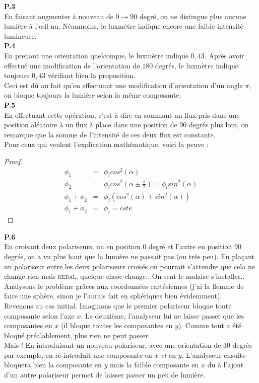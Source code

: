 \documentclass[british,french,11pt, a4paper, openany]{book}
\begin{document}
		\textbf{P.3}\\
		En faisant augmenter à nouveau de $0 \rightarrow 90$ degré, on ne distingue plus aucune lumière à l'œil nu. Néanmoins, le luxmètre indique encore une faible intensité lumineuse.\\
		
		\textbf{P.4}\\
		En prenant une orientation quelconque, le luxmètre indique $0,43$. Après avoir effectué une modification de l'orientation de $180$ degrés, le luxmètre indique toujours $0,43$ vérifiant bien la proposition.\\
		Ceci est dû au fait qu'en effectuant une modification d'orientation d'un angle $\pi$, on bloque toujours la lumière selon la même composante.\\
		
		\textbf{P.5}\\
		En effectuant cette opération, c'est-à-dire en sommant un flux pris dans une position aléatoire à un flux à place dans une position de $90$ degrés plus loin, on remarque que la somme de l'intensité de ces deux flux est constante.\\
		Pour ceux qui veulent l'explication mathématique, voici la peuve : \\
		\begin{proof}
			\begin{eqnarray}
				\phi_1 &=& \phi_icos^2(\alpha)\\
				\phi_2 &=& \phi_icos^2(\alpha \pm \frac{\pi}{2}) = \phi_isin^2(\alpha)\\
				\phi_1 + \phi_2 &=& \phi_i(cos^2(\alpha) + sin^2(\alpha))\\
				\phi_1 + \phi_2 &=& \phi_i = cste
			\end{eqnarray}
		\end{proof}
		
		\textbf{P.6}\\
		En croisant deux polariseurs, un en position $0$ degré et l'autre en position $90$ degrés, on a vu plus haut que la lumière ne passait pas (ou très peu). En plaçant un polariseur entre les deux polariseurs croisés on pourrait s'attendre que cela ne change rien mais \textsc{kedal}, quelque chose change.. On sent le malaise s'installer..\\
		
		Analysons le problème grâces aux coordonnées cartésiennes (j'ai la flemme de faire une sphère, sinon je l'aurais fait en sphériques bien évidemment).\\
		Revenons au cas initial.  Imaginons que le premier polariseur bloque toute composante selon l'axe $x$. Le deuxième, l'analyseur lui ne laisse passer que les composantes en $x$ (il bloque toutes les composantes en $y$). Comme tout a été bloqué préalablement, plus rien ne peut passer.\\
		Mais ! En introduisant un nouveau polariseur, avec une orientation de $30$ degrés par exemple, en ré-introduit une composante en $x$ \textit{et} en $y$. L'analyseur ensuite bloquera bien la composante en $y$ mais la faible composante en $x$ du à l'ajout d'un autre polariseur permet de laisser passer un peu de lumière.\\
		
\end{document}
